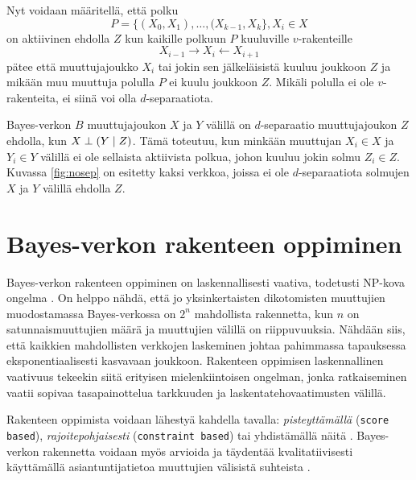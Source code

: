 Nyt voidaan määritellä, että polku 
$$ 
    P = \{(X_0, X_1), \ldots ,(X_{k-1}, X_k\}, X_i \in X 
$$  
on aktiivinen ehdolla $Z$ kun kaikille polkuun $P$ kuuluville $v$-rakenteille 
$$ 
    X_{i-1} \rightarrow X_i \leftarrow X_{i+1} 
$$ 
pätee että muuttujajoukko $X_i$ tai jokin sen jälkeläisistä kuuluu joukkoon $Z$ ja mikään muu muuttuja polulla $P$ ei kuulu joukkoon $Z$. Mikäli polulla ei ole $v$-rakenteita, ei siinä voi olla $d$-separaatiota. 

Bayes-verkon $B$ muuttujajoukon $X$ ja $Y$ välillä on $d$-separaatio muuttujajoukon $Z$ ehdolla, kun $X \perp (Y \mid Z)$. Tämä toteutuu, kun minkään muuttujan $X_i \in X$ ja $Y_i \in Y$ välillä ei ole sellaista aktiivista polkua, johon kuuluu jokin solmu $Z_i \in Z$. Kuvassa \ref{fig:nosep} on esitetty kaksi verkkoa, joissa ei ole $d$-separaatiota solmujen $X$ ja $Y$ välillä ehdolla $Z$. 

\begin{center} 
\end{center} 

\section{Bayes-verkon rakenteen oppiminen} 

Bayes-verkon rakenteen oppiminen on laskennallisesti vaativa, todetusti NP-kova ongelma \citep{chickering_large-sample_2004}. On helppo nähdä, että jo yksinkertaisten dikotomisten muuttujien muodostamassa Bayes-verkossa on $2^n$ mahdollista rakennetta, kun $n$ on satunnaismuuttujien määrä ja muuttujien välillä on riippuvuuksia. Nähdään siis, että kaikkien mahdollisten verkkojen laskeminen johtaa pahimmassa tapauksessa eksponentiaalisesti kasvavaan joukkoon. Rakenteen oppimisen laskennallinen vaativuus tekeekin siitä erityisen mielenkiintoisen ongelman, jonka ratkaiseminen vaatii sopivaa tasapainottelua tarkkuuden ja laskentatehovaatimusten välillä. 

Rakenteen oppimista voidaan lähestyä kahdella tavalla: \emph{pisteyttämällä} (\texttt{score based}),  \emph{rajoitepohjaisesti} (\texttt{constraint based}) \citep{ramsahai_connecting_2020, scanagatta_survey_2019, mittal_review_2011, scutari_learning_2010} tai yhdistämällä näitä \citep{li_hybrid_2018}. Bayes-verkon rakennetta voidaan myös arvioida ja täydentää kvalitatiivisesti käyttämällä asiantuntijatietoa muuttujien välisistä suhteista \citep{ruggeri_bayesian_2008, myllymaki_bayes-verkkojen_1998}. 

